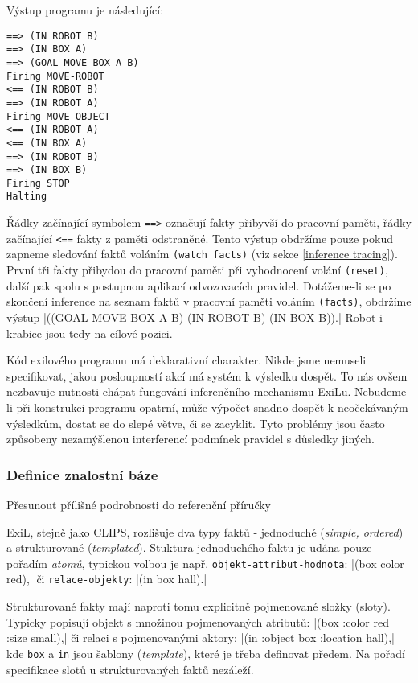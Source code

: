 Výstup programu je následující:
\begin{verbatim}
==> (IN ROBOT B)
==> (IN BOX A)
==> (GOAL MOVE BOX A B)
Firing MOVE-ROBOT
<== (IN ROBOT B)
==> (IN ROBOT A)
Firing MOVE-OBJECT
<== (IN ROBOT A)
<== (IN BOX A)
==> (IN ROBOT B)
==> (IN BOX B)
Firing STOP
Halting
\end{verbatim}
Řádky začínající symbolem \verb|==>| označují fakty přibyvší do pracovní paměti,
řádky začínající \verb|<==| fakty z paměti odstraněné. Tento výstup obdržíme
pouze pokud zapneme sledování faktů voláním \verb|(watch facts)| (viz sekce
\ref{inference tracing}). První tři fakty přibydou do pracovní paměti při
vyhodnocení volání \verb|(reset)|, další pak spolu s postupnou aplikací
odvozovacích pravidel. Dotážeme-li se po skončení inference na seznam faktů v
pracovní paměti voláním \verb|(facts)|, obdržíme výstup
\cl|((GOAL MOVE BOX A B) (IN ROBOT B) (IN BOX B)).|
Robot i krabice jsou tedy na cílové pozici.

Kód exilového programu má deklarativní charakter. Nikde jsme nemuseli
specifikovat, jakou posloupností akcí má systém k výsledku dospět. To nás ovšem
nezbavuje nutnosti chápat fungování inferenčního mechanismu ExiLu. Nebudeme-li
při konstrukci programu opatrní, může výpočet snadno dospět k neočekávaným
výsledkům, dostat se do slepé větve, či se zacyklit. Tyto problémy jsou často
způsobeny nezamýšlenou interferencí podmínek pravidel s důsledky jiných.

\FloatBarrier

\subsubsection{Definice znalostní báze}
\label{knowledge base definition}
\begin{framed}
Přesunout přílišné podrobnosti do referenční příručky
\end{framed}

ExiL, stejně jako CLIPS, rozlišuje dva typy faktů - jednoduché (\emph{simple,
ordered}) a strukturované (\emph{templated}). Stuktura jednoduchého faktu je udána
pouze pořadím \emph{atomů}, typickou volbou je např. \verb|objekt-attribut-hodnota|:
\cl|(box color red),| či \verb|relace-objekty|: \cl|(in box hall).|

Strukturované fakty mají naproti tomu explicitně pojmenované složky (sloty).
Typicky popisují objekt s množinou pojmenovaných atributů: \cl|(box :color red :size small),|
či relaci s pojmenovanými aktory: \cl|(in :object box :location hall),| kde
\verb|box| a \verb|in| jsou šablony (\emph{template}), které je třeba definovat
předem. Na pořadí specifikace slotů u strukturovaných faktů
nezáleží.

